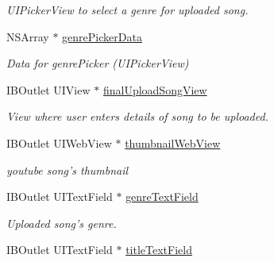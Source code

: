\begin{DoxyCompactItemize}
\begin{DoxyCompactList}\small\item\em U\-I\-Picker\-View to select a genre for uploaded song. \end{DoxyCompactList}\item 
\hypertarget{interface_c_b_h_view_controller_a42054403ea069b1f964e74a08fc429a9}{N\-S\-Array $\ast$ \hyperlink{interface_c_b_h_view_controller_a42054403ea069b1f964e74a08fc429a9}{genre\-Picker\-Data}}\label{interface_c_b_h_view_controller_a42054403ea069b1f964e74a08fc429a9}

\begin{DoxyCompactList}\small\item\em Data for genre\-Picker (U\-I\-Picker\-View) \end{DoxyCompactList}\item 
\hypertarget{interface_c_b_h_view_controller_a0b3711ade53cab7f4dedffb3bfd1a4c3}{I\-B\-Outlet U\-I\-View $\ast$ \hyperlink{interface_c_b_h_view_controller_a0b3711ade53cab7f4dedffb3bfd1a4c3}{final\-Upload\-Song\-View}}\label{interface_c_b_h_view_controller_a0b3711ade53cab7f4dedffb3bfd1a4c3}

\begin{DoxyCompactList}\small\item\em View where user enters details of song to be uploaded. \end{DoxyCompactList}\item 
\hypertarget{interface_c_b_h_view_controller_ac45c42f77d2b9716de9121d17d03b2a3}{I\-B\-Outlet U\-I\-Web\-View $\ast$ \hyperlink{interface_c_b_h_view_controller_ac45c42f77d2b9716de9121d17d03b2a3}{thumbnail\-Web\-View}}\label{interface_c_b_h_view_controller_ac45c42f77d2b9716de9121d17d03b2a3}

\begin{DoxyCompactList}\small\item\em youtube song's thumbnail \end{DoxyCompactList}\item 
\hypertarget{interface_c_b_h_view_controller_a3e84c0f2fe5a22a12e9798b7db14d558}{I\-B\-Outlet U\-I\-Text\-Field $\ast$ \hyperlink{interface_c_b_h_view_controller_a3e84c0f2fe5a22a12e9798b7db14d558}{genre\-Text\-Field}}\label{interface_c_b_h_view_controller_a3e84c0f2fe5a22a12e9798b7db14d558}

\begin{DoxyCompactList}\small\item\em Uploaded song's genre. \end{DoxyCompactList}\item 
\hypertarget{interface_c_b_h_view_controller_ad6496527c6783d1937a1fd87789b03e6}{I\-B\-Outlet U\-I\-Text\-Field $\ast$ \hyperlink{interface_c_b_h_view_controller_ad6496527c6783d1937a1fd87789b03e6}{title\-Text\-Field}}\label{interface_c_b_h_view_controller_ad6496527c6783d1937a1fd87789b03e6}


\end{DoxyCompactItemize}
